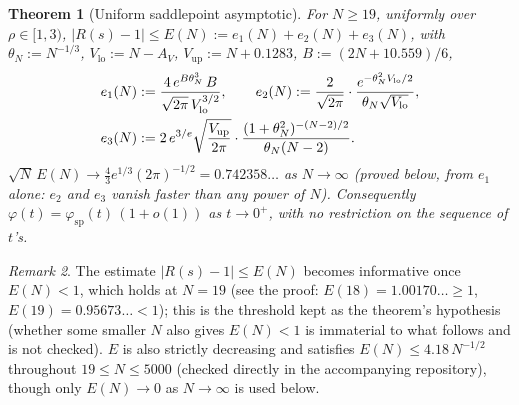 \documentclass[11pt]{amsart}
\theoremstyle{plain}
\newtheorem{theorem}{Theorem}
\theoremstyle{definition}
\theoremstyle{remark}
\newtheorem{remark}[theorem]{Remark}
\begin{document}
\begin{theorem}[Uniform saddlepoint asymptotic]
\label{thm:formulaA}
For $N\ge19$, uniformly over $\rho\in[1,3)$, $|R(s)-1|\le E(N) := e_1(N)+e_2(N)+e_3(N)$, with
$\theta_N := N^{-1/3}$, $V_{\mathrm{lo}} := N-A_V$, $V_{\mathrm{up}} := N+0.1283$,
$B := (2N+10.559)/6$,
\begin{align}
e_1(N) &:= \frac{4\,e^{B\theta_N^3}\,B}{\sqrt{2\pi}\,V_{\mathrm{lo}}^{3/2}}, \qquad
e_2(N) := \frac{2}{\sqrt{2\pi}}\cdot\frac{e^{-\theta_N^2V_{\mathrm{lo}}/2}}{\theta_N\sqrt{V_{\mathrm{lo}}}},
\label{eq:Ebound}\\
e_3(N) &:= 2\,e^{3/e}\sqrt{\frac{V_{\mathrm{up}}}{2\pi}}\cdot
\frac{(1+\theta_N^2)^{-(N-2)/2}}{\theta_N(N-2)}. \notag
\end{align}
$\sqrt N\,E(N) \to \tfrac43e^{1/3}(2\pi)^{-1/2} = 0.742358\ldots$ as $N\to\infty$
(proved below, from $e_1$ alone: $e_2$ and $e_3$ vanish faster than any power of $N$).
Consequently $\varphi(t) = \varphi_{\mathrm{sp}}(t)\,(1+o(1))$ as $t \to 0^+$, with no restriction
on the sequence of $t$'s.
\end{theorem}

\begin{remark}
The estimate $|R(s)-1|\le E(N)$ becomes informative once $E(N)<1$, which holds at $N=19$ (see the
proof: $E(18)=1.00170\ldots\ge1$, $E(19)=0.95673\ldots<1$); this is the threshold kept as the
theorem's hypothesis (whether some smaller $N$ also gives $E(N)<1$ is immaterial to what follows and
is not checked). $E$ is also strictly decreasing and satisfies $E(N)\le4.18\,N^{-1/2}$ throughout
$19\le N\le5000$
(checked directly in the accompanying repository), though only $E(N)\to0$ as $N\to\infty$ is used
below.
\end{remark}
\end{document}

